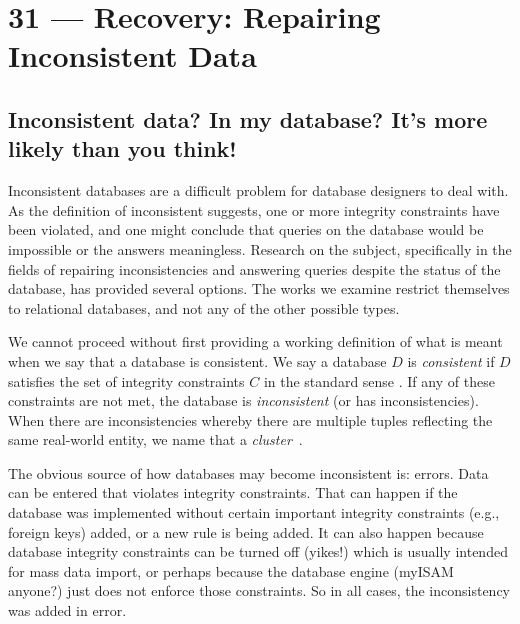 \documentclass[a4paper]{report}
\begin{document}
\chapter*{31 --- Recovery: Repairing Inconsistent Data}


\section*{Inconsistent data? In my database? It's more likely than you think!}

Inconsistent databases are a difficult problem for database designers to deal with. As the definition of inconsistent suggests, one or more integrity constraints have been violated, and one might conclude that queries on the database would be impossible or the answers meaningless. Research on the subject, specifically in the fields of repairing inconsistencies and answering queries despite the status of the database, has provided several options. The works we examine restrict themselves to relational databases, and not any of the other possible types.

We cannot proceed without first providing a working definition of what is meant when we say that a database is consistent. We say a database $D$ is \textit{consistent} if $D$ satisfies the set of integrity constraints $C$ in the standard sense \cite{CQI}. If any of these constraints are not met, the database is \textit{inconsistent} (or has inconsistencies). When there are inconsistencies whereby there are multiple tuples reflecting the same real-world entity, we name that a \textit{cluster}~\cite{CA}.

The obvious source of how databases may become inconsistent is: errors. Data can be entered that violates integrity constraints. That can happen if the database was implemented without certain important integrity constraints (e.g., foreign keys) added, or a new rule is being added. It can also happen because database integrity constraints can be turned off (yikes!) which is usually intended for mass data import, or perhaps because the database engine (myISAM anyone?) just does not enforce those constraints. So in all cases, the inconsistency was added in error. 
\end{document}
